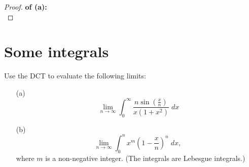 \documentclass[lang=cn,11pt]{elegantbook}
\begin{document}
\begin{proof}
    \textbf{of (a):} \\
    
\end{proof}






\section{Some integrals}
    Use the DCT to evaluate the following limits:
  \begin{itemize}
  \item[(a)]\[\
      \lim_{n\to \infty} \int_0^\infty \frac{n\sin\left(\frac{x}{n}\right)}{x(1+x^2)} \; d x
    \]
  \item[(b)] \[
      \lim_{n\to\infty} \int_0^n x^m \left( 1- \frac{x}{n} \right)^n \; d x,
    \]
    where $m$ is a non-negative integer. (The integrals are Lebesgue integrals.)
  \end{itemize}
\end{document}
